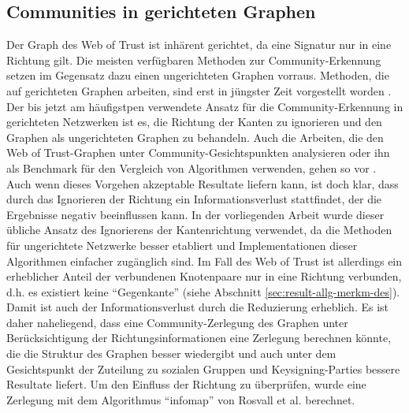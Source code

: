 \subsection{Communities in gerichteten Graphen}
\label{sec:comm-gericht-graph}
Der Graph des Web of Trust ist inh\"arent gerichtet, da eine Signatur
nur in eine Richtung gilt. Die meisten verf\"ugbaren Methoden zur
Community-Erkennung setzen im Gegensatz dazu einen ungerichteten
Graphen vorraus. Methoden, die auf gerichteten Graphen arbeiten, sind
erst in j\"ungster Zeit vorgestellt worden \cite{Leicht2008}
\cite{Rosvall2008}. Der bis jetzt am h\"aufigstpen verwendete Ansatz
f\"ur die Community-Erkennung in gerichteten Netzwerken ist es, die
Richtung der Kanten zu ignorieren und den Graphen als ungerichteten
Graphen zu behandeln. Auch die Arbeiten, die den Web of Trust-Graphen
unter Community-Gesichtspunkten analysieren oder ihn als Benchmark
f\"ur den Vergleich von Algorithmen verwenden, gehen so vor
\cite{Boguna2004}. Auch wenn dieses Vorgehen akzeptable Resultate
liefern kann, ist doch klar, dass durch das Ignorieren der Richtung
ein Informationsverlust stattfindet, der die Ergebnisse negativ
beeinflussen kann. In der vorliegenden Arbeit wurde dieser \"ubliche
Ansatz des Ignorierens der Kantenrichtung verwendet, da die Methoden
f\"ur ungerichtete Netzwerke besser etabliert und Implementationen
dieser Algorithmen einfacher zug\"anglich sind. Im Fall des Web of
Trust ist allerdings ein erheblicher Anteil der verbundenen
Knotenpaare nur in eine Richtung verbunden, d.h. es existiert keine
``Gegenkante'' (siehe Abschnitt
\ref{sec:result-allg-merkm-des}). Damit ist auch der
Informationsverlust durch die Reduzierung erheblich. Es ist daher
naheliegend, dass eine Community-Zerlegung des Graphen unter
Ber\"ucksichtigung der Richtungsinformationen eine Zerlegung berechnen
k\"onnte, die die Struktur des Graphen besser wiedergibt und auch
unter dem Gesichtspunkt der Zuteilung zu sozialen Gruppen und
Keysigning-Parties bessere Resultate liefert. Um den Einfluss der
Richtung zu \"uberpr\"ufen, wurde eine Zerlegung mit dem Algorithmus
``infomap'' von Rosvall et al. \cite{Rosvall2008} berechnet.

